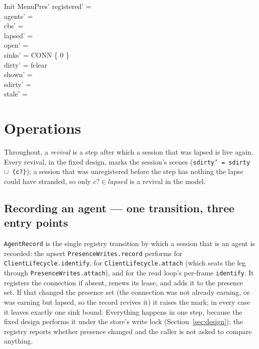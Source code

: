 \documentclass[a4paper,10pt,fleqn]{article}
\begin{document}
\begin{schema}{Init}
  MenuPres'
\where
  registered' = \emptyset \\
  agents' = \emptyset \\
  cbs' = \emptyset \\
  lapsed' = \emptyset \\
  open' = \emptyset \\
  sinks' = CONN \cross \{ 0 \} \\
  dirty' = fclear \\
  shown' = \emptyset \\
  sdirty' = \emptyset \\
  stale' = \emptyset
\end{schema}

\section{Operations}

Throughout, a \emph{revival} is a step after which a session that was lapsed is
live again. Every revival, in the fixed design, marks the session's scenes
(\texttt{sdirty' = sdirty $\cup$ \{c?\}}); a session that was unregistered
before the step has nothing the lapse could have stranded, so only
$c? \in lapsed$ is a revival in the model.

\subsection{Recording an agent --- one transition, three entry points}

\texttt{AgentRecord} is the single registry transition by which a session
that is an agent is recorded: the upsert \texttt{PresenceWrites.record}
performs for \texttt{ClientLifecycle.identify}, for
\texttt{ClientLifecycle.attach} (which seats the leg through
\texttt{PresenceWrites.attach}), and for the read loop's per-frame
\texttt{identify}. It registers the connection if absent, renews its lease,
and adds it to the presence set. If that changed the presence set (the
connection was not already earning, or was earning but lapsed, so the record
revives it) it raises the mark; in every case it leaves exactly one sink bound.
Everything happens in one step, because the fixed design performs it under the
store's write lock (Section~\ref{sec:design}); the registry reports whether
presence changed and the caller is not asked to compare anything.
\end{document}
